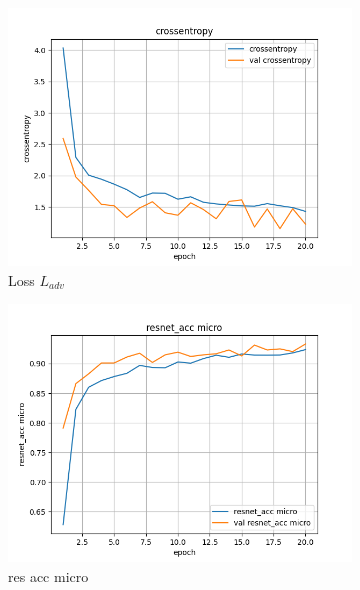 \begin{figure}[ht]
    \centering
    \begin{subfigure}{0.32\textwidth}
        \centering
        \includegraphics[width=\linewidth]{../logs/adv_img256_1/crossentropy.png}
        \caption{Loss $L_{adv}$}
    \end{subfigure}
    \begin{subfigure}{0.32\textwidth}
        \centering
        \includegraphics[width=\linewidth]{../logs/adv_img256_1/resnet_acc micro.png}
        \caption{res acc micro}
    \end{subfigure}
    \begin{subfigure}{0.32\textwidth}
        \centering

\end{subfigure}
\end{figure}

